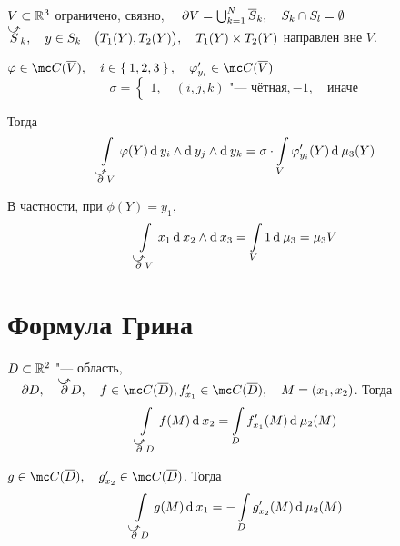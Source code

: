 \begin{theorem}
	$ V \subset \mathbb{R}^3 $ ограничено, связно, $ \quad \partial V = \bigcup_{k = 1}^N \overline S_k, \quad S_k \cap S_l = \emptyset $ \\
	$ \curvedir S_k, \quad y \in S_k \quad \bigl( T_1(Y), T_2(Y) \bigr), \quad T_1(Y) \times T_2(Y) $ направлен вне $ V $.

	$ \phi \in \mc C(\ol V), \quad i \in \set{1, 2, 3}, \quad \phi_{y_i}' \in \mc C(\ol V) $
	$$ \sigma =
	\begin{cases}
		1, \quad (i, j, k) \text{ "--- чётная},
		-1, \quad \text{иначе}
	\end{cases} $$

	Тогда
	$$ \int\limits_{\curvedir \partial V} \phi(Y) \di y_i \wedge \di y_j \wedge \di y_k = \sigma \cdot \int\limits_V \phi_{y_i}'(Y) \di \mu_3(Y) $$

	В частности, при $ \phi(Y) = y_1 $,
	$$ \int\limits_{\curvedir \partial V} x_1 \di x_2 \wedge \di x_3 = \int\limits_V 1 \di \mu_3 = \mu_3 V $$
\end{theorem}

\section{Формула Грина}

\begin{theorem}
	$ D \subset \mathbb{R}^2 $ "--- область, $ \quad \partial D, \quad \curvedir \partial D, \quad f \in \mc C(\ol D), f_{x_1}' \in \mc C(\ol D), \quad M = (x_1, x_2) $. Тогда
	$$ \int\limits_{\curvedir \partial D} f(M) \di x_2 = \int\limits_D f_{x_1}'(M) \di \mu_2(M) $$

	$ g \in \mc C(\ol D), \quad g_{x_2}' \in \mc C(\ol D) $. Тогда
	$$ \int\limits_{\curvedir \partial D} g(M) \di x_1 = - \int\limits_D g_{x_2}'(M) \di \mu_2(M) $$
\end{theorem}
